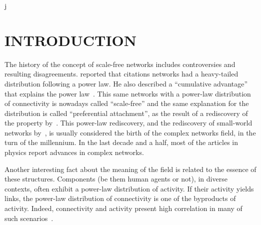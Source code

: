 \documentclass[12pt,fleqn]{article}
\begin{document}
\pagestyle{fancy}                                   j

\section{INTRODUCTION}
The history of the concept of scale-free networks includes controversies and resulting disagreements.
\cite{price1}
reported that citations networks had a heavy-tailed distribution following a power law.
He also described a ``cumulative advantage'' that explains the power law~\citep{price2}.
This same networks with a power-law distribution of connectivity is nowadays called ``scale-free''
and the same explanation for the distribution is called ``preferential attachment'',
as the result of a rediscovery of the property by~\cite{barabasi1}.
This power-law rediscovery, and the rediscovery of small-world networks by~\cite{small},
is usually considered the birth of the complex networks field,
in the turn of the millennium.
In the last decade and a half,
most of the articles in physics report advances in complex networks.

Another interesting fact about the meaning of the field
is related to the essence of these structures.
Components (be them human agents or not), in diverse contexts, often
exhibit a power-law distribution of activity.
If their activity yields links,
the power-law distribution of connectivity is one of the byproducts of activity.
Indeed, connectivity and activity present high correlation in many of such scenarios~\citep{fabbri1,fabbri2,fabbri3}.
\end{document}
